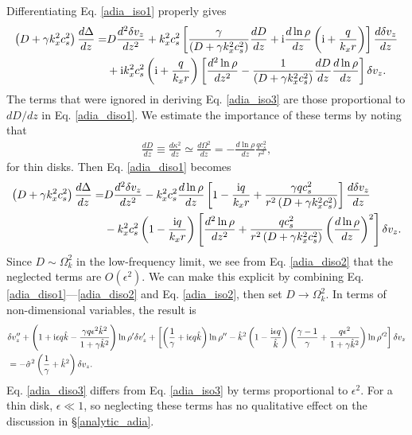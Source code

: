 Differentiating Eq. \ref{adia_iso1} properly gives
\begin{align}
  \left(D + \gamma k_x^2 c_s^2\right)\frac{d\Delta}{dz}=& D
  \frac{d^2\delta v_z}{dz^2} + k_x^2c_s^2\left[\frac{\gamma}{\left(D + \gamma k_x^2 c_s^2\right)}\frac{dD}{dz} + \mathrm{i}
    \frac{d\ln\rho}{dz}\left(\mathrm{i} +
      \frac{q}{k_xr}\right)\right]\frac{d\delta v_z}{dz}\notag\\
  &+ \mathrm{i} k_x^2 c_s^2 \left(\mathrm{i} +
      \frac{q}{k_xr}\right)\left[\frac{d^2\ln\rho}{dz^2} -
      \frac{1}{\left(D + \gamma
          k_x^2c_s^2\right)}\frac{dD}{dz}\frac{d\ln\rho}{dz}\right]\delta
    v_z. \label{adia_diso1}
\end{align}
The terms that were ignored in deriving Eq. \ref{adia_iso3} are those
proportional to $dD/dz$ in Eq. \ref{adia_diso1}. We estimate the
importance of these terms by noting that 
\begin{align}
  \frac{dD}{dz}\equiv \frac{d\kappa^2}{dz} \simeq \frac{d\Omega^2}{dz}
  = - \frac{d\ln\rho}{dz}\frac{qc_s^2}{r^2},
\end{align}
for thin disks. Then Eq. \ref{adia_diso1} becomes
\begin{align}
\left(D + \gamma k_x^2 c_s^2\right)\frac{d\Delta}{dz}=& D
  \frac{d^2\delta v_z}{dz^2} - k_x^2c_s^2\frac{d\ln\rho}{dz}\left[ 1 - 
      \frac{\mathrm{i} q}{k_xr}  +  \frac{\gamma q c_s^2}{r^2\left(D +
        \gamma k_x^2 c_s^2\right)}\right]\frac{d\delta
    v_z}{dz}\notag\\ 
  &- k_x^2 c_s^2 \left(1 - 
      \frac{\mathrm{i} q}{k_xr}\right)\left[\frac{d^2\ln\rho}{dz^2} + 
      \frac{qc_s^2}{r^2\left(D + \gamma
          k_x^2c_s^2\right)}\left(\frac{d\ln\rho}{dz}\right)^2\right]\delta
    v_z. \label{adia_diso2}
\end{align}
Since $D\sim \Omega_k^2$ in the low-frequency limit, we 
see from Eq. \ref{adia_diso2} that the neglected terms are
$O(\epsilon^2)$. We can make this explicit by combining
Eq. \ref{adia_diso1}---\ref{adia_diso2} and Eq. \ref{adia_iso2}, then
set $D\to\Omega_k^2$. In terms of non-dimensional variables, the result
is  
\begin{align}
   &\delta v_z ^{\prime\prime} + \left(1 + \mathrm{i}\epsilon q\hat{k} -
    \frac{\gamma q \epsilon^2\hat{k}^2}{1+\gamma
      \hat{k}^2}\right)\ln\rho^{\prime}\delta v_z^\prime +
  \left[\left(\frac{1}{\gamma} + \mathrm{i} \epsilon q
      \hat{k}\right)\ln\rho^{\prime\prime} - \hat{k}^2\left(1 -
      \frac{\mathrm{i}\epsilon
        q}{\hat{k}}\right)\left(\frac{\gamma-1}{\gamma} +
      \frac{q\epsilon^2}{1+\gamma\hat{k}^2}\right)\ln\rho^{\prime
      2}\right]\delta v_z \notag\\&=
  -\hat{\sigma}^2\left(\frac{1}{\gamma} + \hat{k}^2\right)\delta v_z\label{adia_diso3}.
\end{align}   
Eq. \ref{adia_diso3} differs from Eq. \ref{adia_iso3} by terms
proportional to $\epsilon^2$. For a thin disk, $\epsilon\ll1$, so
neglecting these terms has no qualitative effect on the discussion in
\S\ref{analytic_adia}. 